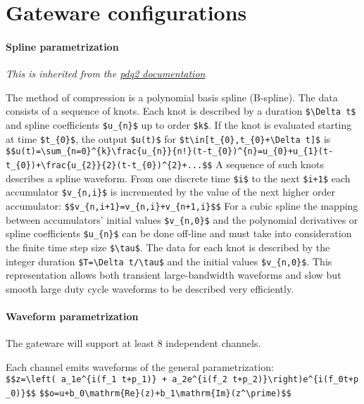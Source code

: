 \section{Gateware configurations}
\paragraph{Spline parametrization}\label{spline-parametrization}

\emph{This is inherited from the
	\href{http://pdq2.readthedocs.io/en/latest/}{pdq2 documentation}}

The method of compression is a polynomial basis spline (B-spline). The
data consists of a sequence of knots. Each knot is described by a
duration \texttt{\$\textbackslash{}Delta\ t\$} and spline coefficients
\texttt{\$u\_\{n\}\$} up to order \texttt{\$k\$}. If the knot is
evaluated starting at time \texttt{\$t\_\{0\}\$}, the output
\texttt{\$u(t)\$} for
\texttt{\$t\textbackslash{}in{[}t\_\{0\},t\_\{0\}+\textbackslash{}Delta\ t{]}\$}
is
\texttt{\$\$u(t)=\textbackslash{}sum\_\{n=0\}\^{}\{k\}\textbackslash{}frac\{u\_\{n\}\}\{n!\}(t-t\_\{0\})\^{}\{n\}=u\_\{0\}+u\_\{1\}(t-t\_\{0\})+\textbackslash{}frac\{u\_\{2\}\}\{2\}(t-t\_\{0\})\^{}\{2\}+...\$\$}
A sequence of such knots describes a spline waveform. From one discrete
time \texttt{\$i\$} to the next \texttt{\$i+1\$} each accumulator
\texttt{\$v\_\{n,i\}\$} is incremented by the value of the next higher
order accumulator: \texttt{\$\$v\_\{n,i+1\}=v\_\{n,i\}+v\_\{n+1,i\}\$\$}
For a cubic spline the mapping between accumulators' initial values
\texttt{\$v\_\{n,0\}\$} and the polynomial derivatives or spline
coefficients \texttt{\$u\_\{n\}\$} can be done off-line and must take
into consideration the finite time step size
\texttt{\$\textbackslash{}tau\$}. The data for each knot is described by
the integer duration
\texttt{\$T=\textbackslash{}Delta\ t/\textbackslash{}tau\$} and the
initial values \texttt{\$v\_\{n,0\}\$}. This representation allows both
transient large-bandwidth waveforms and slow but smooth large duty cycle
waveforms to be described very efficiently.

\paragraph{Waveform parametrization}\label{waveform-parametrization}

The gateware will support at least 8 independent channels.

Each channel emits waveforms of the general parametrization:
\texttt{\$\$z=\textbackslash{}left(\ a\_1e\^{}\{i(f\_1\ t+p\_1)\}\ +\ a\_2e\^{}\{i(f\_2\ t+p\_2)\}\textbackslash{}right)e\^{}\{i(f\_0t+p\_0)\}\$\$}
\texttt{\$\$o=u+b\_0\textbackslash{}mathrm\{Re\}(z)+b\_1\textbackslash{}mathrm\{Im\}(z\^{}\textbackslash{}prime)\$\$}

